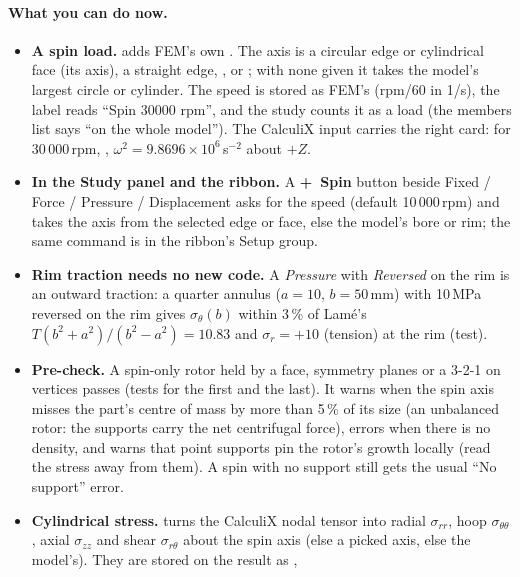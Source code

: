 \paragraph{What you can do now.}
\begin{itemize}[nosep]
  \item \textbf{A spin load.}  adds FEM's own .
        The axis is a circular edge or cylindrical face (its axis), a straight edge, , or
        ; with none given it takes the model's largest circle or cylinder. The speed is stored as FEM's
         (rpm/60 in 1/s), the label reads ``Spin 30000 rpm'', and the study counts it as a load
        (the members list says ``on the whole model''). The CalculiX input carries the right card: for 30\,000\,rpm,
        , $\omega^2=9.8696\times10^6$\,s$^{-2}$ about $+Z$.
  \item \textbf{In the Study panel and the ribbon.} A \textbf{+~Spin} button beside Fixed / Force / Pressure /
        Displacement asks for the speed (default 10\,000\,rpm) and takes the axis from the selected edge or face, else the
        model's bore or rim; the same command is in the ribbon's Setup group.
  \item \textbf{Rim traction needs no new code.} A \emph{Pressure} with \emph{Reversed} on the rim is an outward traction:
        a quarter annulus ($a=10$, $b=50$\,mm) with 10\,MPa reversed on the rim gives $\sigma_\theta(b)$ within 3\,\% of
        Lam\'e's $T(b^2+a^2)/(b^2-a^2)=10.83$ and $\sigma_r=+10$ (tension) at the rim (test).
  \item \textbf{Pre-check.} A spin-only rotor held by a face, symmetry planes or a 3-2-1 on vertices passes (tests for the
        first and the last). It warns when the spin axis misses the part's centre of mass by more than 5\,\% of its size
        (an unbalanced rotor: the supports carry the net centrifugal force), errors when there is no density, and warns
        that point supports pin the rotor's growth locally (read the stress away from them). A spin with no support still
        gets the usual ``No support'' error.
  \item \textbf{Cylindrical stress.}  turns the CalculiX nodal tensor into
        radial $\sigma_{rr}$, hoop $\sigma_{\theta\theta}$, axial $\sigma_{zz}$ and shear $\sigma_{r\theta}$ about the spin
        axis (else a picked axis, else the model's). They are stored on the result as ,

\end{itemize}
